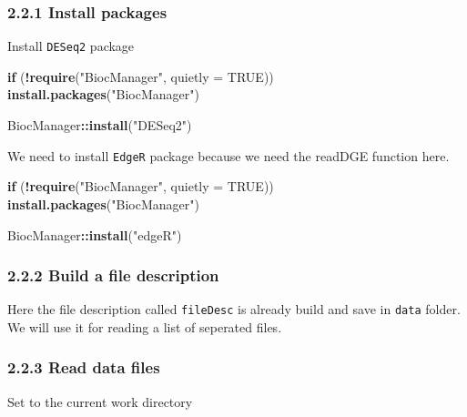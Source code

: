 \documentclass[
]{article}
\newenvironment{Shaded}{\begin{snugshade}}{\end{snugshade}}
\newcommand{\AttributeTok}[1]{\textcolor[rgb]{0.13,0.29,0.53}{#1}}
\newcommand{\ConstantTok}[1]{\textcolor[rgb]{0.56,0.35,0.01}{#1}}
\newcommand{\ControlFlowTok}[1]{\textcolor[rgb]{0.13,0.29,0.53}{\textbf{#1}}}
\newcommand{\FunctionTok}[1]{\textcolor[rgb]{0.13,0.29,0.53}{\textbf{#1}}}
\newcommand{\NormalTok}[1]{#1}
\newcommand{\SpecialCharTok}[1]{\textcolor[rgb]{0.81,0.36,0.00}{\textbf{#1}}}
\newcommand{\StringTok}[1]{\textcolor[rgb]{0.31,0.60,0.02}{#1}}
\begin{document}
\subsubsection{2.2.1 Install packages}\label{install-packages}

Install \texttt{DESeq2} package

\begin{Shaded}
\begin{Highlighting}[]
\ControlFlowTok{if}\NormalTok{ (}\SpecialCharTok{!}\FunctionTok{require}\NormalTok{(}\StringTok{"BiocManager"}\NormalTok{, }\AttributeTok{quietly =} \ConstantTok{TRUE}\NormalTok{))}
    \FunctionTok{install.packages}\NormalTok{(}\StringTok{"BiocManager"}\NormalTok{)}

\NormalTok{BiocManager}\SpecialCharTok{::}\FunctionTok{install}\NormalTok{(}\StringTok{"DESeq2"}\NormalTok{)}
\end{Highlighting}
\end{Shaded}

We need to install \texttt{EdgeR} package because we need the readDGE
function here.

\begin{Shaded}
\begin{Highlighting}[]
\ControlFlowTok{if}\NormalTok{ (}\SpecialCharTok{!}\FunctionTok{require}\NormalTok{(}\StringTok{"BiocManager"}\NormalTok{, }\AttributeTok{quietly =} \ConstantTok{TRUE}\NormalTok{))}
    \FunctionTok{install.packages}\NormalTok{(}\StringTok{"BiocManager"}\NormalTok{)}

\NormalTok{BiocManager}\SpecialCharTok{::}\FunctionTok{install}\NormalTok{(}\StringTok{"edgeR"}\NormalTok{)}
\end{Highlighting}
\end{Shaded}

\subsubsection{2.2.2 Build a file
description}\label{build-a-file-description}

Here the file description called \texttt{fileDesc} is already build and
save in \texttt{data} folder. We will use it for reading a list of
seperated files.

\subsubsection{2.2.3 Read data files}\label{read-data-files}

Set to the current work directory
\end{document}
